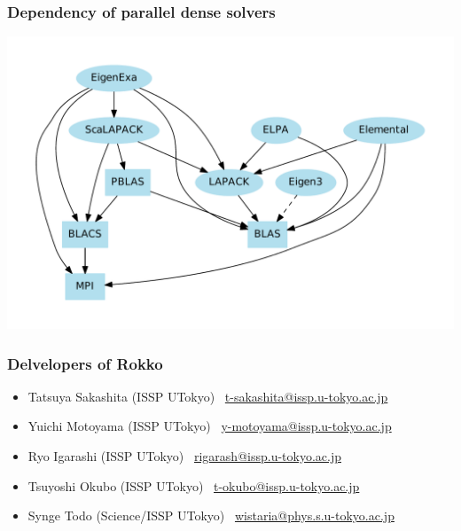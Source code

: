 \begin{frame}
  \frametitle{Dependency of parallel dense solvers}
  \begin{center}
    \includegraphics[height=0.8\textheight]{figure/eigensolver_dependency.pdf}
  \end{center}
\end{frame}

\begin{frame}
  \frametitle{Delvelopers of Rokko}
  \begin{itemize}
    \setlength{\itemsep}{1em}
  \item Tatsuya Sakashita (ISSP UTokyo) \ \href{mailto:t-sakashita@issp.u-tokyo.ac.jp}{t-sakashita@issp.u-tokyo.ac.jp}
  \item Yuichi Motoyama (ISSP UTokyo) \ \href{mailto:y-motoyama@issp.u-tokyo.ac.jp}{y-motoyama@issp.u-tokyo.ac.jp}
  \item Ryo Igarashi (ISSP UTokyo) \ \href{mailto:rigarash@issp.u-tokyo.ac.jp}{rigarash@issp.u-tokyo.ac.jp}
  \item Tsuyoshi Okubo (ISSP UTokyo) \ \href{mailto:t-okubo@issp.u-tokyo.ac.jp}{t-okubo@issp.u-tokyo.ac.jp}
  \item Synge Todo (Science/ISSP UTokyo) \ \href{mailto:wistaria@phys.s.u-tokyo.ac.jp}{wistaria@phys.s.u-tokyo.ac.jp}
  \end{itemize}
\end{frame}

